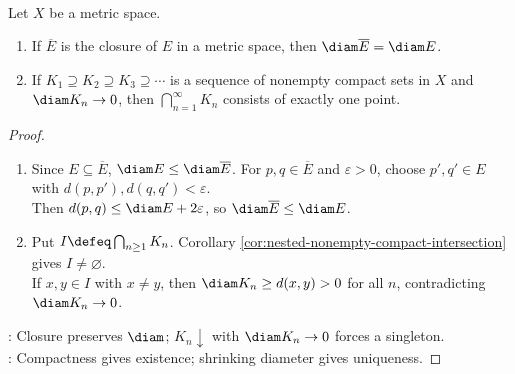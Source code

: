 \begin{theorem} \label{thm:nested-compact-diameters-singleton} \\
Let $X$ be a metric space.
\begin{enumerate}[label=(\roman*)]
\setlength{\itemsep}{0pt}
\item If $\overline{E}$ is the closure of $E$ in a metric space, then $\diam\overline{E}=\diam E$.
\item If $K_1\supseteq K_2\supseteq K_3\supseteq\cdots$ is a sequence of nonempty compact sets in $X$ and $\diam K_n\to0$, then $\bigcap_{n=1}^{\infty}K_n$ consists of exactly one point.
\end{enumerate}
\begin{proof}
\begin{enumerate}[label=(\roman*)]
\setlength{\itemsep}{0pt}
\item Since $E\subseteq\overline{E}$, $\diam E\leq\diam\overline{E}$. For $p,q\in\overline{E}$ and $\varepsilon>0$, choose $p',q'\in E$ with $d(p,p'),d(q,q')<\varepsilon$.\\
Then $d(p,q)\leq\diam E+2\varepsilon$, so $\diam\overline{E}\leq\diam E$.
\item Put $I\defeq\bigcap_{n\geq1}K_n$. Corollary \ref{cor:nested-nonempty-compact-intersection} gives $I\neq\varnothing$.\\
If $x,y\in I$ with $x\neq y$, then $\diam K_n\geq d(x,y)>0$ for all $n$, contradicting $\diam K_n\to0$.
\end{enumerate}
: Closure preserves $\diam$; $K_n\downarrow$ with $\diam K_n\to0$ forces a singleton.\\
: Compactness gives existence; shrinking diameter gives uniqueness.
\end{proof}
\end{theorem}

